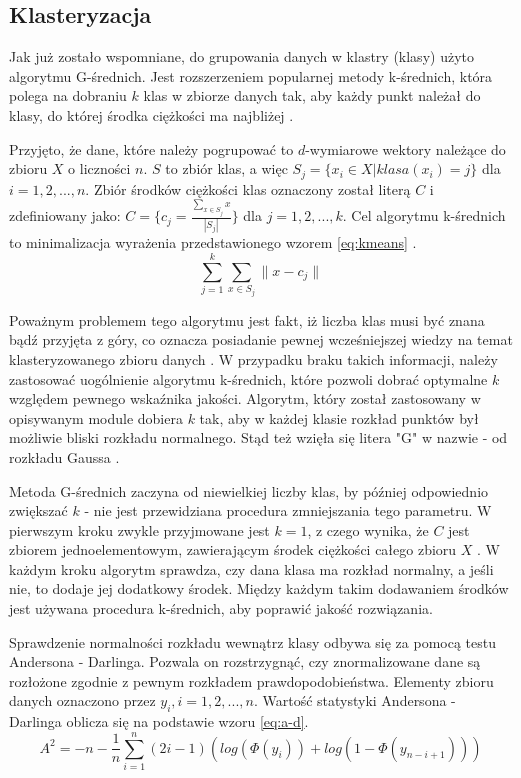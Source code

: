 \subsection{Klasteryzacja}
\quad Jak już zostało wspomniane, do grupowania danych w klastry (klasy) użyto algorytmu G-średnich. Jest rozszerzeniem popularnej metody k-średnich, która polega na dobraniu $k$ klas w zbiorze danych tak, aby każdy punkt należał do klasy, do której środka ciężkości ma najbliżej \cite{KMeans}.

Przyjęto, że dane, które należy pogrupować to $d$-wymiarowe wektory należące do zbioru $X$ o liczności $n$. $S$ to zbiór klas, a więc $S_{j} = \{x_{i} \in X | klasa(x_{i}) = j\}$ dla $i = 1, 2, ..., n$. Zbiór środków ciężkości klas oznaczony został literą $C$ i zdefiniowany jako: $C = \{c_{j} = \frac{\sum_{x \in S_{j}} x}{|S_{j}|}\}$ dla $j = 1, 2, ..., k$.
Cel algorytmu k-średnich to minimalizacja wyrażenia przedstawionego wzorem \ref{eq:kmeans} .
\begin{equation}
\label{eq:kmeans}
\sum_{j=1}^{k}\sum_{x \in S_{j}} \|x - c_{j}\|
\end{equation}

Poważnym problemem tego algorytmu jest fakt, iż liczba klas musi być znana bądź przyjęta z góry, co oznacza posiadanie pewnej wcześniejszej wiedzy na temat klasteryzowanego zbioru danych \cite{GMeans, GMeansExplanation}. W przypadku braku takich informacji, należy zastosować uogólnienie algorytmu k-średnich, które pozwoli dobrać optymalne $k$ względem pewnego wskaźnika jakości.
Algorytm, który został zastosowany w opisywanym module dobiera $k$ tak, aby w każdej klasie rozkład punktów był możliwie bliski rozkładu normalnego. Stąd też wzięła się litera "G" w nazwie - od rozkładu Gaussa \cite{GMeans}.

Metoda G-średnich zaczyna od niewielkiej liczby klas, by później odpowiednio zwiększać $k$ - nie jest przewidziana procedura zmniejszania tego parametru. W pierwszym kroku zwykle przyjmowane jest $k = 1$, z czego wynika, że $C$ jest zbiorem jednoelementowym, zawierającym środek ciężkości całego zbioru $X$ \cite{GMeans}. W każdym kroku algorytm sprawdza, czy dana klasa ma rozkład normalny, a jeśli nie, to dodaje jej dodatkowy środek. Między każdym takim dodawaniem środków jest używana procedura k-średnich, aby poprawić jakość rozwiązania.

Sprawdzenie normalności rozkładu wewnątrz klasy odbywa się za pomocą testu Andersona - Darlinga. Pozwala on rozstrzygnąć, czy znormalizowane dane są rozłożone zgodnie z pewnym rozkładem prawdopodobieństwa. Elementy zbioru danych oznaczono przez $y_{i}, i = 1, 2, ..., n$. Wartość statystyki Andersona - Darlinga oblicza się na podstawie wzoru \ref{eq:a-d}.
\begin{equation}
\label{eq:a-d}
	A^{2} = -n - \frac{1}{n} \sum_{i=1}^{n}(2i - 1)(log(\Phi(y_{i})) + log(1 - \Phi(y_{n-i+1})))
\end{equation}

